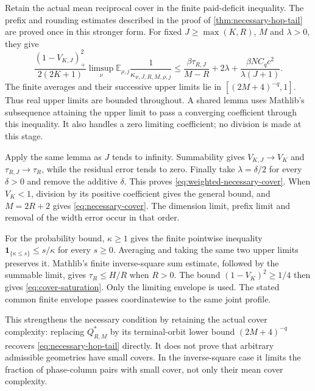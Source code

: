 \begin{outline}
Retain the actual mean reciprocal cover in the finite paid-deficit
inequality. The prefix and rounding estimates described in the proof of
\cref{thm:necessary-hop-tail} are proved once in this stronger form.
For fixed $J\ge\max(K,R)$, $M$ and $\lambda>0$, they give
\[
 \frac{(1-V_{K,J})_+^2}{2(2K+1)}
    \limsup_\nu\mathbb E_{\rho,j}\frac1{\kappa_{\nu,J,R,M,\rho,j}}
 \le \frac{\beta\tau_{R,J}}{M-R}+2\lambda
       +\frac{\beta NC_qc^2}{\lambda(J+1)}.
\]
The finite averages and their successive upper limits lie in
$[(2M+4)^{-q},1]$. Thus real upper limits are bounded throughout.
A shared lemma uses Mathlib's subsequence attaining the upper limit to
pass a converging coefficient through this inequality. It also handles
a zero limiting coefficient; no division is made at this stage.

Apply the same lemma as $J$ tends to infinity. Summability gives
$V_{K,J}\to V_K$ and $\tau_{R,J}\to\tau_R$, while the residual error
tends to zero. Finally take $\lambda=\delta/2$ for every $\delta>0$
and remove the additive $\delta$. This proves
\cref{eq:weighted-necessary-cover}. When $V_K<1$, division by its
positive coefficient gives the general bound, and $M=2R+2$ gives
\cref{eq:necessary-cover}. The dimension limit, prefix limit and
removal of the width error occur in that order.

For the probability bound, $\kappa\ge1$ gives the finite pointwise
inequality $\mathbf1_{\{\kappa\le s\}}\le s/\kappa$ for every
$s\ge0$. Averaging and taking the same two upper limits preserves it.
Mathlib's finite inverse-square sum estimate, followed by the summable
limit, gives $\tau_R\le H/R$ when $R>0$. The bound
$(1-V_K)^2\ge1/4$ then gives \cref{eq:cover-saturation}.
Only the limiting envelope is used. The stated common finite envelope
passes coordinatewise to the same joint profile.
\end{outline}

This strengthens the necessary condition by retaining the actual cover
complexity: replacing $Q_{R,M}^*$ by its terminal-orbit lower bound
$(2M+4)^{-q}$ recovers \cref{eq:necessary-hop-tail} directly.
It does not prove that arbitrary admissible geometries have small
covers. In the inverse-square case it limits the fraction of phase-column
pairs with small cover, not only their mean cover complexity.

